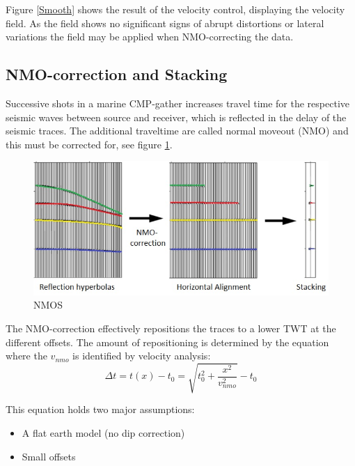 \documentclass[10pt,a4paper]{article}
\begin{document}
Figure \ref{Smooth} shows the result of the velocity control, displaying the velocity field. As the field shows no significant signs of abrupt distortions or lateral variations the field may be applied when NMO-correcting the data.


\subsection{NMO-correction and Stacking}

Successive shots in a marine CMP-gather increases travel time for the respective seismic waves between source and receiver, which is reflected in the delay of the seismic traces. The additional traveltime are called normal moveout (NMO) and this must be corrected for, see figure \ref{NMOS}.

\begin{figure}[H]
\includegraphics[width=\textwidth]{NMOcorr_stacking.jpg}
\caption{NMOS}
\label{NMOS}
\end{figure}

\noindent The NMO-correction effectively repositions the traces to a lower TWT at the different offsets. The amount of repositioning is determined by the equation where the $v_{nmo}$ is identified by velocity analysis:
$$
\Delta t = t(x) - t_0 = \sqrt{t_0^2 + \frac{x^2}{v_{nmo}^2}}-t_0
$$

This equation holds two major assumptions:

\begin{itemize}
    \item A flat earth model (no dip correction)
    \item Small offsets
\end{itemize}
\end{document}
